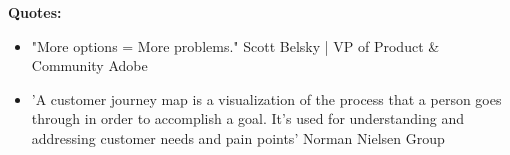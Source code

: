 \textbf{Quotes:}

\begin{itemize}
\item "More options = More problems." Scott Belsky | VP of Product \& Community Adobe
\item 'A customer journey map is a visualization of the process that a person goes through in order to accomplish a goal. It's used for understanding and addressing customer needs and pain points' Norman Nielsen Group
\end{itemize}

